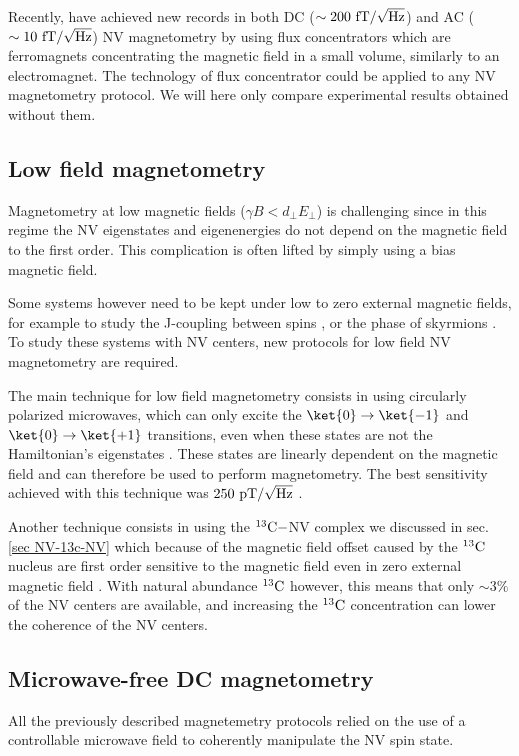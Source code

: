 \documentclass[a4paper, 11pt]{report}
\begin{document}
Recently, \citep{xie2021hybrid} have achieved new records in both DC ($\sim 200\ \rm fT/\sqrt{\rm Hz}$) and AC ($\sim 10\ \rm fT/\sqrt{\rm Hz}$) NV magnetometry by using flux concentrators which are ferromagnets concentrating the magnetic field in a small volume, similarly to an electromagnet. The technology of flux concentrator could be applied to any NV magnetometry protocol. We will here only compare experimental results obtained without them.

\subsection{Low field magnetometry}
Magnetometry at low magnetic fields ($\gamma B < d_\perp E_\perp$) is challenging since in this regime the NV eigenstates and eigenenergies do not depend on the magnetic field to the first order. This complication is often lifted by simply using a bias magnetic field.

Some systems however need to be kept under low to zero external magnetic fields, for example to study the J-coupling between spins \citep{sutter2012computational}, or the phase of skyrmions \citep{zazvorka2020skyrmion}. To study these systems with NV centers, new protocols for low field NV magnetometry are required.

The main technique for low field magnetometry consists in using circularly polarized microwaves, which can only excite the $\ket{0} \to \ket{-1}$ and $\ket{0} \to \ket{+1}$ transitions, even when these states are not the Hamiltonian's eigenstates \citep{mrozek2015circularly, zheng2019zero, lenz2021magnetic, vetter2022zero}. These states are linearly dependent on the magnetic field and can therefore be used to perform magnetometry. The best sensitivity achieved with this technique was $250\ \rm pT/\sqrt{\rm Hz}$ \citep{zheng2019zero}.

Another technique consists in using the $^{13}\rm{C}-$NV complex we discussed in sec. \ref{sec NV-13c-NV} which because of the magnetic field offset caused by the $^{13}\rm{C}$ nucleus are first order sensitive to the magnetic field even in zero external magnetic field \citep{wang2022zero}. With natural abundance $^{13}\rm{C}$ however, this means that only $\sim 3\%$ of the NV centers are available, and increasing the $^{13}\rm{C}$ concentration can lower the coherence of the NV centers. 

\subsection{Microwave-free DC magnetometry}
All the previously described magnetemetry protocols relied on the use of a controllable microwave field to coherently manipulate the NV spin state.
\end{document}

